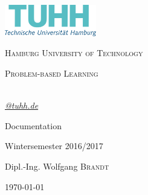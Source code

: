 \begin{titlepage}
	\centering
	\includegraphics[width=0.30\textwidth]{pictures/office_rgb_de.png}\par\vspace{1cm}
	{\scshape\LARGE Hamburg University of Technology \par}
	\vspace{1cm}
	{\scshape\Large Problem-based Learning\par}
	\vspace{1.5cm}
	{\huge\bfseries \thetitle\par}
	\vspace{2cm}
	{\Large\itshape \theauthor\\\href{mailto:@tuhh.de}{@tuhh.de}\par}
	
	\vfill	%
	Documentation\par	%
	
	\vfill	%
	Wintersemester 2016/2017\par
	Dipl.-Ing. Wolfgang \textsc{Brandt}

	\vfill

	{\large \today\par}
\end{titlepage}


